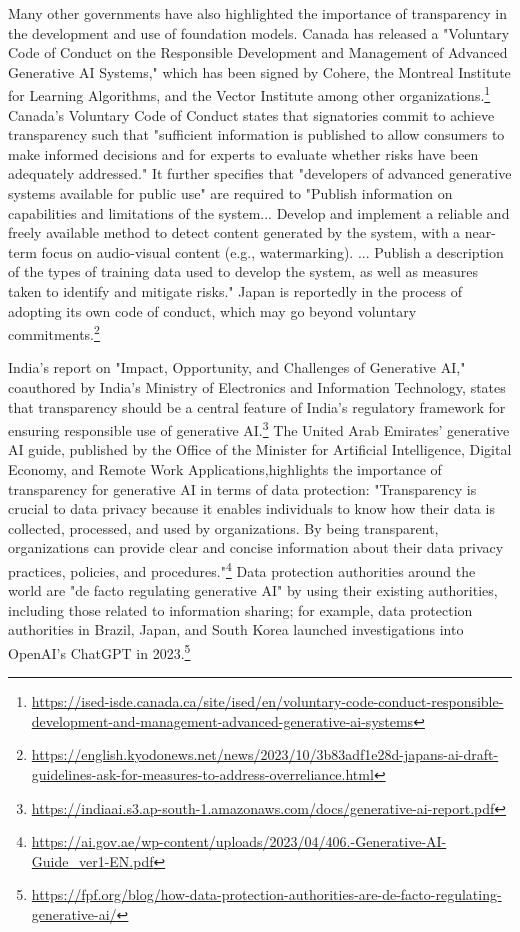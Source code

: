 \documentclass[screen, authorversion, acmsmall]{acmart}
\begin{document}
Many other governments have also highlighted the importance of transparency in the development and use of foundation models. 
Canada has released a "Voluntary Code of Conduct on the Responsible Development and Management of Advanced Generative AI Systems," which has been signed by Cohere, the Montreal Institute for Learning Algorithms, and the Vector Institute among other organizations.\footnote{\url{https://ised-isde.canada.ca/site/ised/en/voluntary-code-conduct-responsible-development-and-management-advanced-generative-ai-systems}} 
Canada's Voluntary Code of Conduct states that signatories commit to achieve transparency such that "sufficient information is published to allow consumers to make informed decisions and for experts to evaluate whether risks have been adequately addressed."
It further specifies that "developers of advanced generative systems available for public use" are required to "Publish information on capabilities and limitations of the system... Develop and implement a reliable and freely available method to detect content generated by the system, with a near-term focus on audio-visual content (e.g., watermarking). ... Publish a description of the types of training data used to develop the system, as well as measures taken to identify and mitigate risks." Japan is reportedly in the process of adopting its own code of conduct, which may go beyond voluntary commitments.\footnote{\url{https://english.kyodonews.net/news/2023/10/3b83adf1e28d-japans-ai-draft-guidelines-ask-for-measures-to-address-overreliance.html}}

India's report on "Impact, Opportunity, and Challenges of Generative AI," coauthored by India's Ministry of Electronics and Information Technology, states that transparency should be a central feature of India's regulatory framework for ensuring responsible use of generative AI.\footnote{\url{https://indiaai.s3.ap-south-1.amazonaws.com/docs/generative-ai-report.pdf}} The United Arab Emirates' generative AI guide, published by the Office of the Minister for Artificial Intelligence, Digital Economy, and Remote Work Applications,highlights the importance of transparency for generative AI in terms of data protection: "Transparency is crucial to data privacy because it enables individuals to know how their data is collected, processed, and used by organizations. By being transparent, organizations can provide clear and concise information about their data privacy practices, policies, and procedures."\footnote{\url{https://ai.gov.ae/wp-content/uploads/2023/04/406.-Generative-AI-Guide_ver1-EN.pdf}} Data protection authorities around the world are "de facto regulating generative AI" by using their existing authorities, including those related to information sharing; for example, data protection authorities in Brazil, Japan, and South Korea launched investigations into OpenAI's ChatGPT in 2023.\footnote{\url{https://fpf.org/blog/how-data-protection-authorities-are-de-facto-regulating-generative-ai/}}
\end{document}
